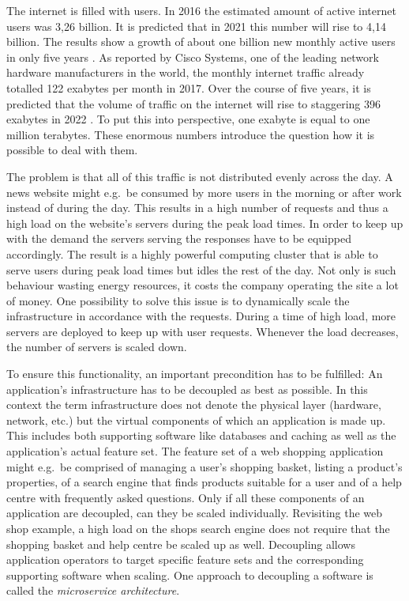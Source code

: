 
The internet is filled with users. In 2016 the estimated amount of active
internet users was 3,26 billion. It is predicted that in 2021 this number will
rise to 4,14 billion. The results show a growth of about one billion new
monthly active users in only five years
\autocite{eMarketerAnzahlderInternetnutzer2017}. As reported by Cisco Systems,
one of the leading network hardware manufacturers in the world, the monthly
internet traffic already totalled 122 exabytes per month in 2017. Over the
course of five years, it is predicted that the volume of traffic on the
internet will rise to staggering 396 exabytes in 2022
\autocite{SystemsDatenvolumendesglobalen2018}. To put this into perspective,
one exabyte is equal to one million terabytes. These enormous numbers introduce
the question how it is possible to deal with them.

The problem is that all of this traffic is not distributed evenly across the
day. A news website might e.g.\ be consumed by more users in the morning or
after work instead of during the day. This results in a high number of requests
and thus a high load on the website's servers during the peak load times. In
order to keep up with the demand the servers serving the responses have to be
equipped accordingly. The result is a highly powerful computing cluster that is
able to serve users during peak load times but idles the rest of the day. Not
only is such behaviour wasting energy resources, it costs the company operating
the site a lot of money. One possibility to solve this issue is to dynamically
scale the infrastructure in accordance with the requests.  During a time of
high load, more servers are deployed to keep up with user requests. Whenever
the load decreases, the number of servers is scaled down.

To ensure this functionality, an important precondition has to be fulfilled: An
application's infrastructure has to be decoupled as best as possible. In this
context the term infrastructure does not denote the physical layer (hardware,
network, etc.) but the virtual components of which an application is made up.
This includes both supporting software like databases and caching as well as
the application's actual feature set. The feature set of a web shopping
application might e.g.\ be comprised of managing a user's shopping basket,
listing a product's properties, of a search engine that finds products suitable
for a user and of a help centre with frequently asked questions. Only if all
these components of an application are decoupled, can they be scaled
individually. Revisiting the web shop example, a high load on the shops search
engine does not require that the shopping basket and help centre be scaled up
as well. Decoupling allows application operators to target specific feature
sets and the corresponding supporting software when scaling. One approach to
decoupling a software is called the \textit{microservice architecture}.

